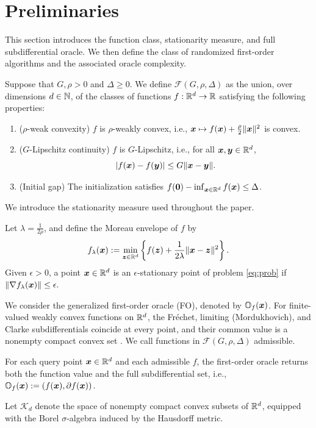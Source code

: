 \section{Preliminaries}
\label{sec:pre}  
This section introduces the function class, stationarity
measure, and full subdifferential oracle. We then define the class of randomized first-order algorithms and the
associated oracle complexity.
\begin{definition}
Suppose that \(G,\rho>0\) and \(\Delta\geq0\). We define \(\mathcal F(G,\rho,\Delta)\)
as the union, over dimensions \(d\in{\mathbb{N}}\), of the classes of functions
\(f:{\mathbb{R}}^d\to{\mathbb{R}}\) satisfying the following properties:
\begin{enumerate}[label=(\roman*)]
 \item (\(\rho\)-weak convexity) \(f\) is \(\rho\)-weakly convex,
 {i.e., $\bm{x}\mapsto f(\bm{x})+\tfrac\rho2\|\bm{x}\|^2$ is convex.} 
 \item ($G$-Lipschitz continuity) $f$ is $G$-Lipschitz, i.e., for all $\bm{x},\bm{y}\in {\mathbb{R}}^d$, 
 $$
 |f(\bm{x})-f(\bm{y})|\leq G\|\bm{x}-\bm{y}\|. 
 $$
 \item (Initial gap)  The initialization satisfies $f({\mathbf 0})-\inf_{\bm{x}\in{\mathbb{R}}^d} f(\bm{x})\leq\Delta$.
\end{enumerate}
\end{definition}
We introduce the stationarity measure used throughout the paper. 
\begin{definition}
\label{def:stationary}
Let $\lambda = \tfrac{1}{2\rho}$, and define the Moreau envelope of $f$ by
\[
f_\lambda(\bm{x})
:=
\min_{\bm{z}\in{\mathbb{R}}^d}
\left\{
f(\bm{z})+\frac{1}{2\lambda}\|\bm{x}-\bm{z}\|^2
\right\}.
\]
Given $\epsilon>0$, a point $\bm{x}\in{\mathbb{R}}^d$ is an
$\epsilon$-stationary point of problem \eqref{eq:prob} if
$
\|\nabla f_\lambda(\bm{x})\|\leq\epsilon.
$ 
\end{definition}
We consider the generalized first-order oracle (FO), denoted by
$\mathbb O_f(\bm{x})$. For finite-valued weakly convex functions on ${\mathbb{R}}^d$, the
Fr\'echet, limiting (Mordukhovich), and Clarke subdifferentials
coincide at every point, and their common value is a nonempty
compact convex set
\citep{rockafellar2009variational,clarke1990optimization,
mordukhovich2006variational}.
We call functions in $\mathcal F(G,\rho,\Delta)$ admissible. 
\begin{definition}
For each query point \(\bm{x}\in{\mathbb{R}}^d\) and each admissible \(f\), the first-order oracle returns both the function value and the full subdifferential set, i.e.,
$\mathbb{O}_f(\bm{x}) := (f(\bm{x}),\partial f(\bm{x}))$. 
\end{definition}
Let $\mathcal K_d$ denote the space of nonempty compact convex
subsets of ${\mathbb{R}}^d$, equipped with the Borel $\sigma$-algebra
induced by the Hausdorff metric.

